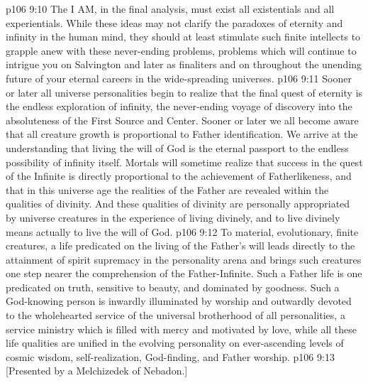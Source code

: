 \vs p106 9:10 The I AM, in the final analysis, must exist  all existentials and  all experientials. While these ideas may not clarify the paradoxes of eternity and infinity in the human mind, they should at least stimulate such finite intellects to grapple anew with these never\hyp{}ending problems, problems which will continue to intrigue you on Salvington and later as finaliters and on throughout the unending future of your eternal careers in the wide\hyp{}spreading universes.
\pc \vs p106 9:11 Sooner or later all universe personalities begin to realize that the final quest of eternity is the endless exploration of infinity, the never\hyp{}ending voyage of discovery into the absoluteness of the First Source and Center. Sooner or later we all become aware that all creature growth is proportional to Father identification. We arrive at the understanding that living the will of God is the eternal passport to the endless possibility of infinity itself. Mortals will sometime realize that success in the quest of the Infinite is directly proportional to the achievement of Fatherlikeness, and that in this universe age the realities of the Father are revealed within the qualities of divinity. And these qualities of divinity are personally appropriated by universe creatures in the experience of living divinely, and to live divinely means actually to live the will of God.
\vs p106 9:12 To material, evolutionary, finite creatures, a life predicated on the living of the Father’s will leads directly to the attainment of spirit supremacy in the personality arena and brings such creatures one step nearer the comprehension of the Father\hyp{}Infinite. Such a Father life is one predicated on truth, sensitive to beauty, and dominated by goodness. Such a God\hyp{}knowing person is inwardly illuminated by worship and outwardly devoted to the wholehearted service of the universal brotherhood of all personalities, a service ministry which is filled with mercy and motivated by love, while all these life qualities are unified in the evolving personality on ever\hyp{}ascending levels of cosmic wisdom, self\hyp{}realization, God\hyp{}finding, and Father worship.
\vsetoff
\vs p106 9:13 [Presented by a Melchizedek of Nebadon.]
